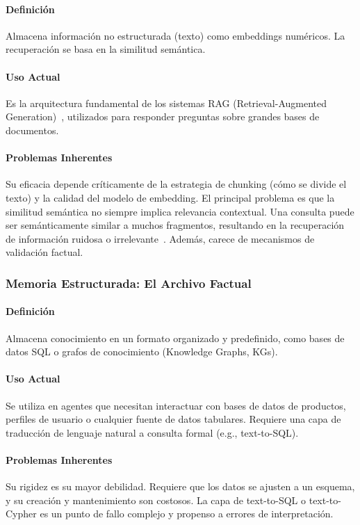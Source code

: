 \documentclass[conference]{IEEEtran}
\begin{document}
\paragraph{Definición} Almacena información no estructurada (texto) como embeddings numéricos. La recuperación se basa en la similitud semántica.

\paragraph{Uso Actual} Es la arquitectura fundamental de los sistemas RAG (Retrieval-Augmented Generation)~\cite{lewis2020retrieval}, utilizados para responder preguntas sobre grandes bases de documentos.

\paragraph{Problemas Inherentes} Su eficacia depende críticamente de la estrategia de chunking (cómo se divide el texto) y la calidad del modelo de embedding. El principal problema es que la similitud semántica no siempre implica relevancia contextual. Una consulta puede ser semánticamente similar a muchos fragmentos, resultando en la recuperación de información ruidosa o irrelevante~\cite{gao2023retrieval}. Además, carece de mecanismos de validación factual.

\subsubsection{Memoria Estructurada: El Archivo Factual}
\paragraph{Definición} Almacena conocimiento en un formato organizado y predefinido, como bases de datos SQL o grafos de conocimiento (Knowledge Graphs, KGs).

\paragraph{Uso Actual} Se utiliza en agentes que necesitan interactuar con bases de datos de productos, perfiles de usuario o cualquier fuente de datos tabulares. Requiere una capa de traducción de lenguaje natural a consulta formal (e.g., text-to-SQL).

\paragraph{Problemas Inherentes} Su rigidez es su mayor debilidad. Requiere que los datos se ajusten a un esquema, y su creación y mantenimiento son costosos. La capa de text-to-SQL o text-to-Cypher es un punto de fallo complejo y propenso a errores de interpretación.
\end{document}
